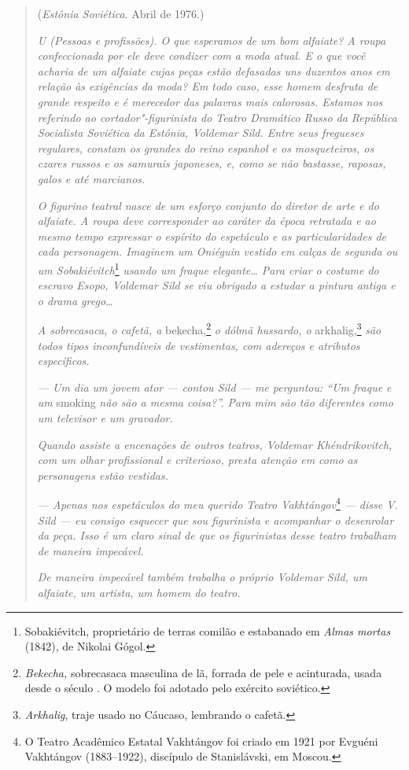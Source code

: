 \begin{quotation}
\begin{flushright}
(\emph{Estônia Soviética}. Abril de 1976.)
\end{flushright}
\vspace{4pt}
\noindent\emph{U (Pessoas e profissões). O que esperamos
de um bom alfaiate? A roupa confeccionada por ele deve condizer com a
moda atual. E o que você acharia de um alfaiate cujas peças estão
defasadas uns duzentos anos em relação às exigências da moda? Em todo
caso, esse homem desfruta de grande respeito e é merecedor das palavras
mais calorosas. Estamos nos referindo ao cortador"-figurinista do Teatro
Dramático Russo da República Socialista Soviética da Estônia, Voldemar
Sild. Entre seus fregueses regulares, constam os grandes do reino
espanhol e os mosqueteiros, os czares russos e os samurais japoneses, e,
como se não bastasse, raposas, galos e até marcianos.}

\emph{O figurino teatral nasce de um esforço conjunto do diretor de arte
e do alfaiate. A roupa deve corresponder ao caráter da época retratada e
ao mesmo tempo expressar o espírito do espetáculo e as particularidades
de cada personagem. Imaginem um Oniéguin vestido em calças de segunda ou
um Sobakiévitch}\footnote{Sobakiévitch, proprietário de terras comilão e
  estabanado em \emph{Almas mortas} (1842), de Nikolai Gógol.}
\emph{usando um fraque elegante\ldots{} Para criar o costume do escravo
Esopo, Voldemar Sild se viu obrigado a estudar a pintura antiga e o
drama grego\ldots{}}

\emph{A sobrecasaca, o cafetã, a} bekecha,\footnote{\emph{Bekecha,}
  sobrecasaca masculina de lã, forrada de pele e acinturada, usada desde
  o século . O modelo foi adotado pelo exército soviético.} \emph{o
dólmã hussardo, o} arkhalig,\footnote{\emph{Arkhalig}, traje
  usado no Cáucaso, lembrando o cafetã.} \emph{são todos tipos
inconfundíveis de vestimentas, com adereços e atributos específicos.}

\emph{--- Um dia um jovem ator --- contou Sild --- me perguntou: ``Um
fraque e um} smoking \emph{não são a mesma coisa?''. Para mim são tão
diferentes como um televisor e um gravador.}

\emph{Quando assiste a encenações de outros teatros, Voldemar
Khéndrikovitch, com um olhar profissional e criterioso, presta atenção
em como as personagens estão vestidas.}

\emph{--- Apenas nos espetáculos do meu querido Teatro
Vakhtángov}\footnote{O Teatro Acadêmico Estatal Vakhtángov foi criado em
  1921 por Evguéni Vakhtángov (1883--1922), discípulo de Stanislávski,
  em Moscou.} \emph{--- disse V. Sild --- eu consigo esquecer que sou
figurinista e acompanhar o desenrolar da peça. Isso é um claro sinal de
que os figurinistas desse teatro trabalham de maneira impecável.}

\emph{De maneira impecável também trabalha o próprio Voldemar Sild, um
alfaiate, um artista, um homem do teatro.}
\end{quotation}

